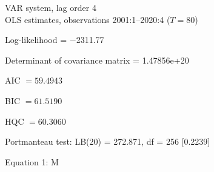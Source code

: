\documentclass[11pt]{article}
\begin{document}
\thispagestyle{empty}

\begin{center}
VAR system, lag order 4\\
OLS estimates, observations 2001:1--2020:4 ($T=80$)
\end{center}
\noindent
Log-likelihood = $-$2311.77\par
\noindent
Determinant of covariance matrix = 1.47856\textrm{e+20}\par
\noindent
AIC $= 59.4943$ \par
\noindent
BIC $= 61.5190$ \par
\noindent
HQC $= 60.3060$ \par
\noindent
Portmanteau test: LB(20) = 272.871, df = 256 [0.2239]\par
\begin{center}

Equation 1: M\\

\vspace{1em}


\end{center}
\end{document}
